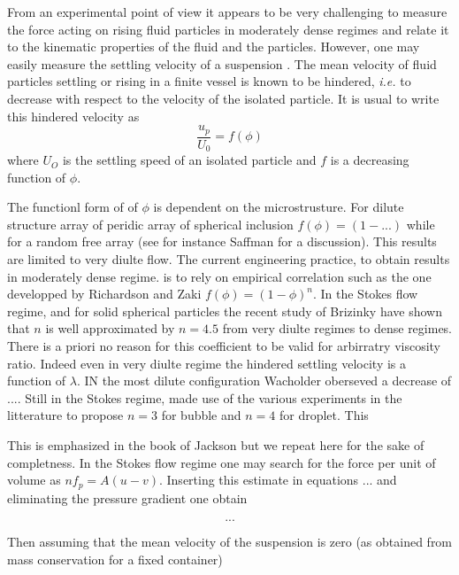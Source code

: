 From an experimental point of view it appears to be very challenging to measure the force acting on rising fluid particles in moderately dense regimes and relate it to the kinematic properties of the fluid and the particles. However, one may easily  measure the settling velocity of a suspension \citep{guazzelli2011}. The mean velocity of fluid particles settling or rising in a finite vessel is known to be hindered, \textit{i.e.} to decrease with respect to the velocity of the isolated particle. It is usual to write this hindered velocity as  
\begin{equation}
\frac{u_p}{U_0} = f(\phi)
\end{equation}
where $U_O$ is the settling speed of an isolated particle and $f$ is a decreasing function of $\phi$. 

The functionl form of  of $\phi$ is dependent on the microstrusture. For dilute structure array of  peridic array of spherical inclusion $f(\phi) =(1 - ...)$ while for a random free array (see for instance Saffman for a discussion). This results are limited to very diulte flow. The current engineering practice, to obtain results in moderately dense regime. is to rely on empirical correlation such as the one developped by Richardson and Zaki $f(\phi) = (1-\phi)^n$. In the Stokes flow regime, and for solid spherical particles the recent study of Brizinky have shown that $n$ is well approximated by $n=4.5$ from very diulte regimes to dense regimes. There is a priori no reason for this coefficient to be valid for arbirratry viscosity ratio. Indeed even in very diulte regime the hindered settling velocity is a function of $\lambda$. IN the most dilute configuration Wacholder oberseved a decrease of .... Still in the Stokes regime, \citet{ishii1979drag} made use of the various experiments in the litterature to propose $n=3$ for bubble and $n=4$ for droplet. This 




This is emphasized in the book of Jackson but we repeat here for the sake of completness. In the Stokes flow regime one may search for the force per unit of volume as $nf_p = A (u -v)$. Inserting this estimate in equations ... and eliminating the pressure gradient one obtain

\begin{equation}
...
\end{equation}


Then assuming that the mean velocity of the suspension is zero (as obtained from mass conservation for a fixed container)

